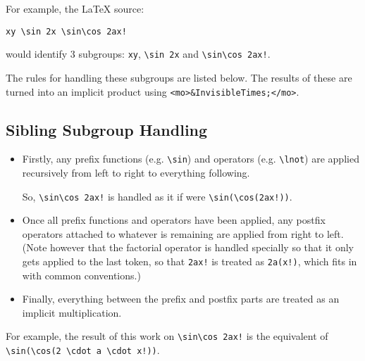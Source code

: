 For example, the LaTeX source:

\begin{verbatim}
xy \sin 2x \sin\cos 2ax!
\end{verbatim}

would identify 3 subgroups: \verb|xy|, \verb|\sin 2x| and \verb|\sin\cos 2ax!|.

The rules for handling these subgroups are listed below. The results of these
are turned into an implicit product using \verb|<mo>&InvisibleTimes;</mo>|.

\subsection*{Sibling Subgroup Handling}

\begin{itemize}
\item Firstly, any prefix functions (e.g. \verb|\sin|) and operators (e.g. \verb|\lnot|)
are applied recursively from left to right to everything following.

So, \verb|\sin\cos 2ax!| is handled as it if were \verb|\sin(\cos(2ax!))|.

\item Once all prefix functions and operators have been applied, any postfix operators
attached to whatever is remaining are applied from right to left. (Note however
that the factorial operator is handled specially so that it only gets applied
to the last token, so that \verb|2ax!| is treated as \verb|2a(x!)|, which fits in
with common conventions.)

\item Finally, everything between the prefix and postfix parts are treated as an
implicit multiplication.
\end{itemize}

For example, the result of this work on \verb|\sin\cos 2ax!| is the equivalent of
\verb|\sin(\cos(2 \cdot a \cdot x!))|.

